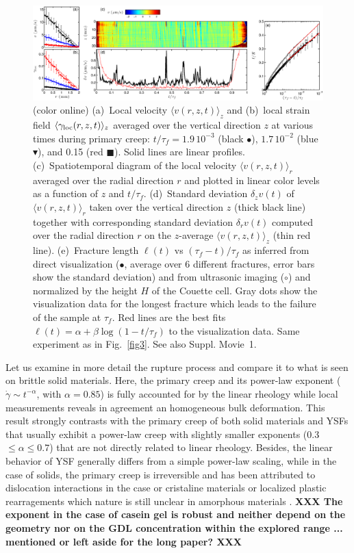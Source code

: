 \documentclass[twocolumn,superscriptaddress,showpacs,preprintnumbers,amsmath,amssymb,prl]{revtex4}
\newcommand\gl{\gamma_{\rm loc}}
\newcommand{\ti}[1]{\textbf{\color{blue}#1}} %
\begin{document}
\begin{figure}
\centering
\includegraphics[width=18cm,clip]{Fig4.eps}
\caption{(color online) (a)~Local velocity $\langle v(r,z,t)\rangle_z$ and (b)~local strain field $\langle\gl(r,z,t)\rangle_z$ averaged over the vertical direction $z$ at various times during primary creep: $t/\tau_f=1.9\,10^{-3}$ (black $\bullet$), $1.7\,10^{-2}$ (blue $\blacktriangledown$), and 0.15 (red $\blacksquare$). Solid lines are linear profiles. (c)~Spatiotemporal diagram of the local velocity $\langle v(r,z,t)\rangle_r$ averaged over the radial direction $r$ and plotted in linear color levels as a function of $z$ and $t/\tau_f$. (d)~Standard deviation $\delta_z v(t)$ of $\langle v(r,z,t)\rangle_r$ taken over the vertical direction $z$ (thick black line) together with corresponding standard deviation $\delta_r v(t)$ computed over the radial direction $r$ on the $z$-average $\langle v(r,z,t)\rangle_z$ (thin red line). (e)~Fracture length $\ell(t)$ vs $(\tau_f-t)/\tau_f$ as inferred from direct visualization ($\bullet$, average over 6 different fractures, error bars show the standard deviation) and from ultrasonic imaging ($\circ$) and normalized by the height $H$ of the Couette cell. Gray dots show the visualization data for the longest fracture which leads to the failure of the sample at $\tau_f$. Red lines are the best fits $\ell(t)=\alpha+\beta\log(1-t/\tau_f)$ to the visualization data. Same experiment as in Fig.~\ref{fig3}. See also Suppl. Movie~1.
\label{fig4}}
\end{figure} 

Let us examine in more detail the rupture process and compare it to what is seen on brittle solid materials. Here, the primary creep and its power-law exponent ($\dot \gamma \sim t^{-\alpha}$, with $\alpha=0.85$) is fully accounted for by the linear rheology while local measurements reveals in agreement an homogeneous bulk deformation. This result strongly contrasts with the primary creep of both solid materials and YSFs \cite{Bauer:2006,Divoux:2011,Siebenburger:2012,Grenard:2013} that usually exhibit a power-law creep with slightly smaller exponents (0.3 $\leq \alpha \leq 0.7$) that are not directly related to linear rheology. Besides, the linear behavior of YSF generally differs from a simple power-law scaling, while in the case of solids, the primary creep is irreversible and has been attributed to dislocation interactions in the case or cristaline materials \cite{Miguel:2002} or localized plastic rearragements which nature is still unclear in amorphous materials \cite{Rosti:2010}. \ti{ XXX The exponent in the case of casein gel is robust and neither depend on the geometry nor on the GDL concentration within the explored range ... mentioned or left aside for the long paper? XXX}
\end{document}
